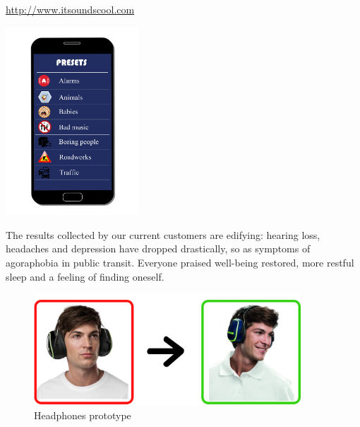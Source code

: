 \documentclass[12pt, a4paper]{article}
\newenvironment{Figure}
  {\par\medskip\noindent\minipage{\linewidth}}
  {\endminipage\par\medskip}
\newenvironment{Figure}
  {\par\medskip\noindent\minipage{\linewidth}}
{\endminipage\par\medskip}
\begin{document}
    \url{http://www.itsoundscool.com}

    \begin{multicols}{2}
        \begin{Figure}
        \centering
        \includegraphics[width=5cm]{pictures/AppSoundsCoolPresets.png}
        \end{Figure}

        The results collected by our current customers are edifying: hearing loss, headaches and depression have dropped drastically, so as symptoms of agoraphobia in public transit. Everyone praised well-being restored, more restful sleep and a feeling of finding oneself.

    \end{multicols}



    \begin{figure}[!h]
        \centering
        \includegraphics[width=10cm]{pictures/AppHappy.png}
        \caption{Headphones prototype}
    \end{figure}
\end{document}
